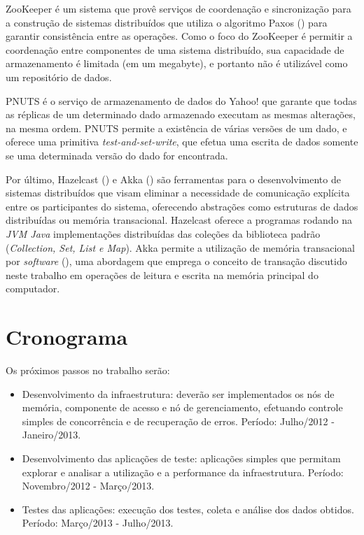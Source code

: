 \documentclass[11pt,twoside,a4paper]{book}
\renewcommand{\chaptermark}[1]{\markboth{\MakeUppercase{#1}}{}}
\begin{document}
ZooKeeper é um sistema que provê serviços de coordenação e sincronização para a construção de sistemas distribuídos que utiliza o algoritmo Paxos (\cite{paxos}) para garantir consistência entre as operações. Como o foco do ZooKeeper é permitir a coordenação entre componentes de uma sistema distribuído, sua capacidade de armazenamento é limitada (em um megabyte), e portanto não é utilizável como um repositório de dados.

PNUTS é o serviço de armazenamento de dados do Yahoo! que garante que todas as réplicas de um determinado dado armazenado executam as mesmas alterações, na mesma ordem. PNUTS permite a existência de várias versões de um dado, e oferece uma primitiva \emph{test-and-set-write}, que efetua uma escrita de dados somente se uma determinada versão do dado for encontrada.

Por último, Hazelcast (\cite{hazelcast}) e Akka (\cite{akka}) são ferramentas para o desenvolvimento de sistemas distribuídos que visam eliminar a necessidade de comunicação explícita entre os participantes do sistema, oferecendo abstrações como estruturas de dados distribuídas ou memória transacional. Hazelcast oferece a programas rodando na \emph{JVM Java} implementações distribuídas das coleções da biblioteca padrão (\emph{Collection, Set, List e Map}). Akka permite a utilização de memória transacional por \emph{software} (\cite{stm}), uma abordagem que emprega o conceito de transação discutido neste trabalho em operações de leitura e escrita na memória principal do computador.

\chapter{Cronograma}
\label{chap:cronograma}
Os próximos passos no trabalho serão:

\begin{itemize}
\item Desenvolvimento da infraestrutura: deverão ser implementados os nós de memória, componente de acesso e nó de gerenciamento, efetuando controle simples de concorrência e de recuperação de erros. Período: Julho/2012 - Janeiro/2013.
\item Desenvolvimento das aplicações de teste: aplicações simples que permitam explorar e analisar a utilização e a performance da infraestrutura. Período: Novembro/2012 - Março/2013.
\item Testes das aplicações: execução dos testes, coleta e análise dos dados obtidos. Período: Março/2013 - Julho/2013.
\end{itemize}

\renewcommand{\chaptermark}[1]{\markboth{\MakeUppercase{\appendixname\ \thechapter}} {\MakeUppercase{#1}} }
\fancyhead[RE,LO]{}
\appendix

\backmatter \singlespacing   %
\end{document}
